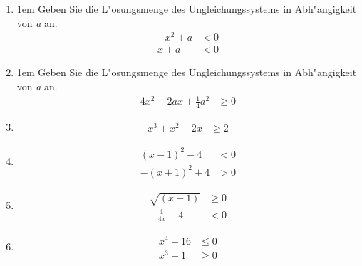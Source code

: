 \begin{enumerate}
\item{\abovedisplayskip1em Geben Sie die L"osungsmenge des Ungleichungssystems in Abh"angigkeit von \textit{a} an. \begin{align*}-x^2 +a &< 0\\ x+a &< 0\end{align*}}
\item{\abovedisplayskip1em Geben Sie die L"osungsmenge des Ungleichungssystems in Abh"angigkeit von \textit{a} an. \begin{align*}4x^2-2ax+\frac{1}{4}a^2 &\geq 0\end{align*}}
\item{ \begin{align*}x^3+x^2-2x &\geq 2\end{align*}}
\item{ \begin{align*}(x-1)^2 -4 &< 0\\ -(x+1)^2 +4 &> 0\end{align*}}
\item{ \begin{align*}\sqrt{(x-1)} &\geq 0\\ -\frac{1}{4x}+4 &< 0\end{align*}}
\item{ \begin{align*}x^4-16 &\leq 0\\ x^3 +1 &\geq 0\end{align*}}
\end{enumerate}


